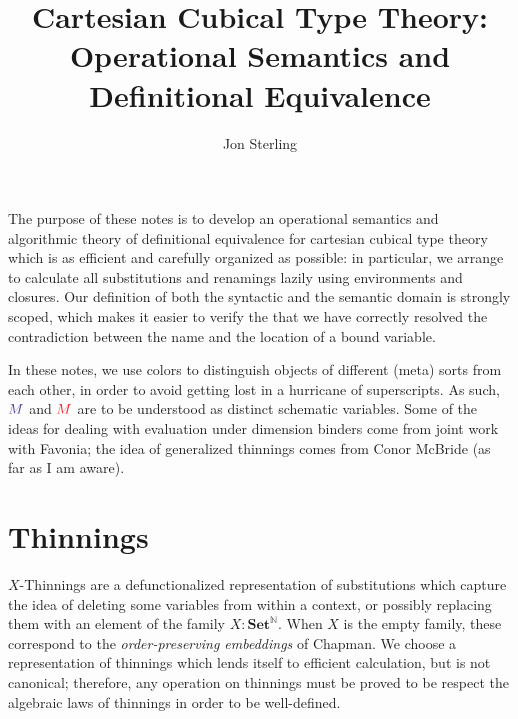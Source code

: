 \documentclass{article}
\title{Cartesian Cubical Type Theory:\\ Operational Semantics and
  Definitional Equivalence} \author{Jon Sterling}
\DeclarePairedDelimiter\Squares{[}{]}
\newcommand\DeclBox[1]{\framebox{$\displaystyle{}#1$}}
\newcommand\FmtThin[1]{{\color{ProcessBlue}#1}}
\newcommand\XThin[3]{{#2}\rightarrowtriangle_{#1}{#3}}
\newcommand\IsXThin[4]{\FmtThin{#1}:\XThin{#2}{#3}{#4}}
\newcommand\ThinId{\mathsf{id}}
\newcommand\ThinKeep[1]{\mbox{\leftthumbsdown}\!\!\rangle\!{#1}\!\langle\!\!\mbox{\rightthumbsdown}}
\newcommand\ThinSkip[1]{{#1}.\mbox{\faTrashO}}
\newcommand\ThinRep[2]{{#1}.\Squares*{{\normalcolor{}#2}}}
\newcommand\SET{\mathbf{Set}}
\newcommand\FmtTm[1]{{\color{Violet}#1}}
\newcommand\FmtVal[1]{{\color{Red}{#1}}}
\begin{document}
\maketitle

The purpose of these notes is to develop an operational semantics and
algorithmic theory of definitional equivalence for cartesian cubical
type theory which is as efficient and carefully organized as possible:
in particular, we arrange to calculate all substitutions and renamings
lazily using environments and closures. Our definition of both the
syntactic and the semantic domain is strongly scoped, which makes it
easier to verify the that we have correctly resolved the contradiction
between the name and the location of a bound variable.

In these notes, we use colors to distinguish objects of different
(meta) sorts from each other, in order to avoid getting lost in a
hurricane of superscripts. As such, $\FmtTm{M}$ and $\FmtVal{M}$ are
to be understood as distinct schematic variables. Some of the ideas
for dealing with evaluation under dimension binders come from joint
work with Favonia; the idea of generalized thinnings comes from Conor
McBride (as far as I am aware).


\section{Thinnings}

$X$-Thinnings are a defunctionalized representation of substitutions
which capture the idea of deleting some variables from within a
context, or possibly replacing them with an element of the family
$X:\SET^{\mathbb{N}}$. When $X$ is the empty family, these correspond
to the \emph{order-preserving embeddings} of Chapman.
%
We choose a representation of thinnings which lends itself to
efficient calculation, but is not canonical; therefore, any operation
on thinnings must be proved to be respect the algebraic laws of
thinnings in order to be well-defined.
\end{document}

